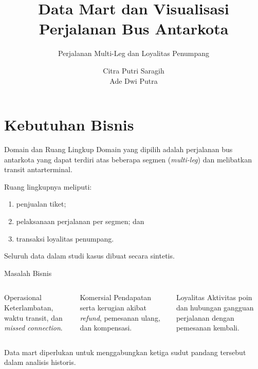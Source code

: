 \documentclass[xcolor=table,t,aspectratio=169]{beamer}
\title[Data Mart Bus Antarkota]{Data Mart dan Visualisasi Perjalanan Bus Antarkota}
\subtitle{Perjalanan Multi-Leg dan Loyalitas Penumpang}
\date{}
\author[Citra dan Ade]{Citra Putri Saragih \\ Ade Dwi Putra}
\institute[UGM]{Data Warehouse \& Business Intelligence\\Universitas Gadjah Mada}
\begin{document}
\frame{ \titlepage}

\section{Kebutuhan Bisnis}

\begin{frame}{Domain dan Ruang Lingkup}
\footnotesize
Domain yang dipilih adalah perjalanan bus antarkota yang dapat terdiri atas
beberapa segmen (\textit{multi-leg}) dan melibatkan transit antarterminal.

\vspace{0.4cm}
Ruang lingkupnya meliputi:
\begin{enumerate}
    \item penjualan tiket;
    \item pelaksanaan perjalanan per segmen; dan
    \item transaksi loyalitas penumpang.
\end{enumerate}

Seluruh data dalam studi kasus dibuat secara sintetis.
\end{frame}

\begin{frame}{Masalah Bisnis}
\footnotesize
\begin{columns}[T]
\begin{block}{Operasional}
Keterlambatan, waktu transit, dan \textit{missed connection}.
\end{block}
\begin{block}{Komersial}
Pendapatan serta kerugian akibat \textit{refund}, pemesanan ulang, dan kompensasi.
\end{block}
\begin{block}{Loyalitas}
Aktivitas poin dan hubungan gangguan perjalanan dengan pemesanan kembali.
\end{block}
\end{columns}

\vspace{0.5cm}
Data mart diperlukan untuk menggabungkan ketiga sudut pandang tersebut dalam
analisis historis.
\end{frame}
\end{document}

